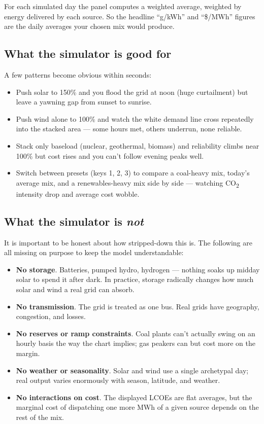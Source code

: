 For each simulated day the panel computes a weighted average,
weighted by energy delivered by each source. So the headline
``g/kWh'' and ``\$/MWh'' figures are the daily averages your chosen
mix would produce.

\subsection*{What the simulator is good for}

A few patterns become obvious within seconds:

\begin{itemize}
    \item Push solar to 150\% and you flood the grid at noon (huge
    curtailment) but leave a yawning gap from sunset to sunrise.
    \item Push wind alone to 100\% and watch the white demand line
    cross repeatedly into the stacked area --- some hours met,
    others underrun, none reliable.
    \item Stack only baseload (nuclear, geothermal, biomass) and
    reliability climbs near 100\% but cost rises and you can't
    follow evening peaks well.
    \item Switch between presets (keys 1, 2, 3) to compare a
    coal-heavy mix, today's average mix, and a renewables-heavy mix
    side by side --- watching CO\textsubscript{2} intensity drop and
    average cost wobble.
\end{itemize}

\subsection*{What the simulator is \emph{not}}

It is important to be honest about how stripped-down this is. The
following are all missing on purpose to keep the model
understandable:

\begin{itemize}
    \item \textbf{No storage}. Batteries, pumped hydro, hydrogen
    --- nothing soaks up midday solar to spend it after dark. In
    practice, storage radically changes how much solar and wind a
    real grid can absorb.
    \item \textbf{No transmission}. The grid is treated as one
    bus. Real grids have geography, congestion, and losses.
    \item \textbf{No reserves or ramp constraints}. Coal plants
    can't actually swing on an hourly basis the way the chart
    implies; gas peakers can but cost more on the margin.
    \item \textbf{No weather or seasonality}. Solar and wind use a
    single archetypal day; real output varies enormously with
    season, latitude, and weather.
    \item \textbf{No interactions on cost}. The displayed LCOEs are
    flat averages, but the marginal cost of dispatching one more MWh
    of a given source depends on the rest of the mix.
\end{itemize}

